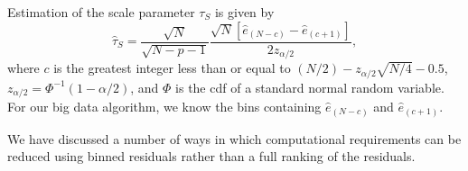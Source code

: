 Estimation of the scale parameter $\tau_S$ is given by
\begin{equation}
	\label{bdtauS}
\widehat{\tau}_S = \frac{\sqrt{N}}{\sqrt{N-p-1}}\frac{\sqrt{N}[\widehat{e}_{(N-c)} - \widehat{e}_{(c+1)}]}{2z_{\alpha/2}},
\end{equation}
where $c$ is the greatest integer less than or equal to $(N/2) - z_{\alpha/2}\sqrt{N/4} - 0.5$,
$z_{\alpha/2} = \Phi^{-1}(1- \alpha/2)$, and $\Phi$ is the cdf of a standard normal random variable.
For our big data algorithm, we know the bins containing $\widehat{e}_{(N-c)}$ and $ \widehat{e}_{(c+1)}$.

We have discussed a number of ways in which computational requirements can be reduced using binned residuals rather than a full ranking of the residuals.  

